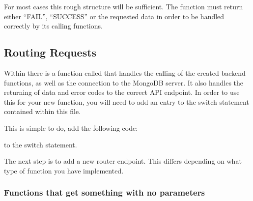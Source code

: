 \documentclass[letterpaper,10pt,english]{sphinxmanual}
\begin{document}
For most cases this rough structure will be sufficient. The function
must return either “FAIL”, “SUCCESS” or the requested data in order to
be handled correctly by its calling functions.


\subsection{Routing Requests}
\label{\detokenize{docs/Expansion/api-expansion:routing-requests}}
Within  there is a function called
 that handles the calling of the created back\sphinxhyphen{}end
functions, as well as the connection to the MongoDB server. It also
handles the returning of data and error codes to the correct API
endpoint. In order to use this for your new function, you will need to
add an entry to the switch statement contained within this file.

This is simple to do, add the following code:

\begin{sphinxVerbatim}[commandchars=\\\{\}]
 
        
\end{sphinxVerbatim}

to the switch statement.

The next step is to add a new router endpoint. This differs depending on
what type of function you have implemented.


\subsubsection{Functions that get something with no parameters}
\label{\detokenize{docs/Expansion/api-expansion:functions-that-get-something-with-no-parameters}}
\begin{sphinxVerbatim}[commandchars=\\\{\}]
      
         
     
     
\end{sphinxVerbatim}
\end{document}
